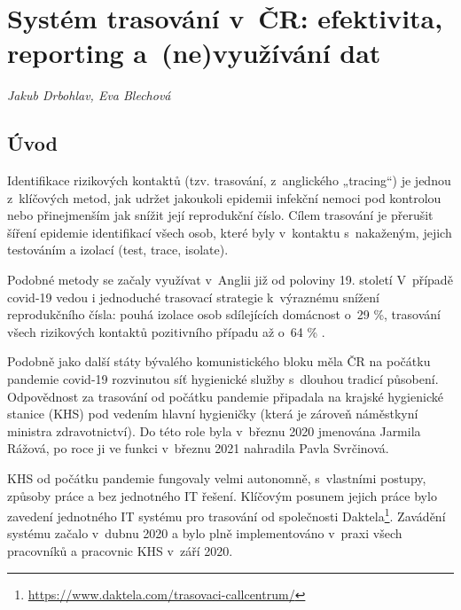 \chapter[Systém trasování v~ČR]{Systém trasování v~ČR: efektivita, reporting a~(ne)využívání dat}\label{Trasovani}

\textit{Jakub Drbohlav, Eva Blechová}
\vspace{15mm}

\section*{Úvod}

Identifikace rizikových kontaktů (tzv. trasování, z~anglického „tracing“) je jednou z~klíčových metod, jak udržet jakoukoli epidemii infekční nemoci pod kontrolou nebo přinejmenším jak snížit její reprodukční číslo. Cílem trasování je přerušit šíření epidemie identifikací všech osob, které byly v~kontaktu s~nakaženým, jejich testováním a izolací (test, trace, isolate).

Podobné metody se začaly využívat v~Anglii již od poloviny 19. století \cite{pg:mooney2020} V~případě covid-19 vedou i jednoduché trasovací strategie k~výraznému snížení reprodukčního čísla: pouhá izolace osob sdílejících domácnost o~29 \%, trasování všech rizikových kontaktů pozitivního případu až o~64 \% \cite{pg:kucharski2020}.

Podobně jako další státy bývalého komunistického bloku měla ČR na počátku pandemie covid-19 rozvinutou síť hygienické služby s~dlouhou tradicí působení. Odpovědnost za trasování od počátku pandemie připadala na krajské hygienické stanice (KHS) pod vedením hlavní hygieničky (která je zároveň náměstkyní ministra zdravotnictví). Do této role byla v~březnu 2020 jmenována Jarmila Rážová, po roce ji ve funkci v~březnu 2021 nahradila Pavla Svrčinová.

KHS od počátku pandemie fungovaly velmi autonomně, s~vlastními postupy, způsoby práce a bez jednotného IT řešení. Klíčovým posunem jejich práce bylo zavedení jednotného IT systému pro trasování od společnosti Daktela\footnote{\url{https://www.daktela.com/trasovaci-callcentrum/}}. Zavádění systému začalo v~dubnu 2020 a bylo plně implementováno v~praxi všech pracovníků a pracovnic KHS v~září 2020.

